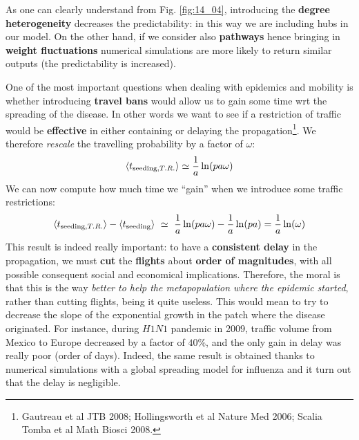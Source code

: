 \documentclass[../main/main.tex]{subfiles}
\begin{document}
As one can clearly understand from Fig. \ref{fig:14_04}, introducing the \textbf{degree heterogeneity} decreases the predictability: in this way we are including hubs in our model. On the other hand, if we consider also \textbf{pathways} hence bringing in \textbf{weight fluctuations} numerical simulations are more likely to return similar outputs (the predictability is increased).


One of the most important questions when dealing with epidemics and mobility is whether introducing \textbf{travel bans} would allow us to gain some time wrt the spreading of the disease. In other words we want to see if a restriction of traffic would be \textbf{effective} in either containing or delaying the propagation\footnote{Gautreau et al JTB 2008; Hollingsworth et al Nature Med 2006; Scalia Tomba et al Math Biosci 2008.}.
We therefore \textit{rescale} the travelling probability by a factor of $\omega$:
\begin{equation}
    \expval{t_{\text{seeding}, T.R.}} \simeq  \frac{1}{a} \ln(p a \omega)
\end{equation}
We can now compute how much time we “gain” when we introduce some traffic restrictions:
\begin{equation}
    \expval{t_{\text{seeding}, T.R.}} - \expval{t_{\text{seeding}}} \ \simeq \   \frac{1}{a} \ln(p a \omega) - \frac{1}{a} \ln(p a) = \frac{1}{a} \ln(\omega)
\end{equation}
This result is indeed really important: to have a \textbf{consistent delay} in the propagation, we must \textbf{cut} the \textbf{flights} about \textbf{order of magnitudes}, with all possible consequent social and economical implications. Therefore, the moral is that this is the way \textit{better to help the metapopulation where the epidemic started}, rather than cutting flights, being it quite useless.
This would mean to try to decrease the slope of the exponential growth in the patch where the disease originated. For instance, during $H1N1$ pandemic in 2009, traffic volume from Mexico to Europe decreased by a factor of $40\%$, and the only gain in delay was really poor (order of days). Indeed, the same result is obtained thanks to numerical simulations with a global spreading model for influenza and it turn out that the delay is negligible.
\end{document}
